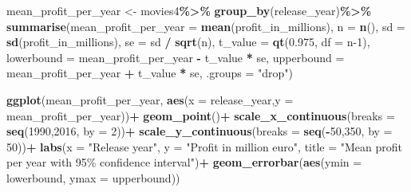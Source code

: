 \documentclass[
]{article}
\newenvironment{Shaded}{\begin{snugshade}}{\end{snugshade}}
\newcommand{\AttributeTok}[1]{\textcolor[rgb]{0.13,0.29,0.53}{#1}}
\newcommand{\DecValTok}[1]{\textcolor[rgb]{0.00,0.00,0.81}{#1}}
\newcommand{\FloatTok}[1]{\textcolor[rgb]{0.00,0.00,0.81}{#1}}
\newcommand{\FunctionTok}[1]{\textcolor[rgb]{0.13,0.29,0.53}{\textbf{#1}}}
\newcommand{\NormalTok}[1]{#1}
\newcommand{\OtherTok}[1]{\textcolor[rgb]{0.56,0.35,0.01}{#1}}
\newcommand{\SpecialCharTok}[1]{\textcolor[rgb]{0.81,0.36,0.00}{\textbf{#1}}}
\newcommand{\StringTok}[1]{\textcolor[rgb]{0.31,0.60,0.02}{#1}}
\begin{document}
\begin{Shaded}
\begin{Highlighting}[]
\NormalTok{mean\_profit\_per\_year }\OtherTok{\textless{}{-}}\NormalTok{ movies4}\SpecialCharTok{\%\textgreater{}\%}
  \FunctionTok{group\_by}\NormalTok{(release\_year)}\SpecialCharTok{\%\textgreater{}\%}
  \FunctionTok{summarise}\NormalTok{(}\AttributeTok{mean\_profit\_per\_year =} \FunctionTok{mean}\NormalTok{(profit\_in\_millions),}
            \AttributeTok{n =} \FunctionTok{n}\NormalTok{(),}
            \AttributeTok{sd =} \FunctionTok{sd}\NormalTok{(profit\_in\_millions),}
            \AttributeTok{se =}\NormalTok{ sd }\SpecialCharTok{/} \FunctionTok{sqrt}\NormalTok{(n),}
            \AttributeTok{t\_value =} \FunctionTok{qt}\NormalTok{(}\FloatTok{0.975}\NormalTok{, }\AttributeTok{df =}\NormalTok{ n}\DecValTok{{-}1}\NormalTok{),}
            \AttributeTok{lowerbound =}\NormalTok{ mean\_profit\_per\_year }\SpecialCharTok{{-}}\NormalTok{ t\_value }\SpecialCharTok{*}\NormalTok{ se,}
            \AttributeTok{upperbound =}\NormalTok{ mean\_profit\_per\_year }\SpecialCharTok{+}\NormalTok{ t\_value }\SpecialCharTok{*}\NormalTok{ se,}
            \AttributeTok{.groups =} \StringTok{"drop"}\NormalTok{)}

\FunctionTok{ggplot}\NormalTok{(mean\_profit\_per\_year, }\FunctionTok{aes}\NormalTok{(}\AttributeTok{x =}\NormalTok{ release\_year,}\AttributeTok{y =}\NormalTok{ mean\_profit\_per\_year))}\SpecialCharTok{+}
  \FunctionTok{geom\_point}\NormalTok{()}\SpecialCharTok{+}
  \FunctionTok{scale\_x\_continuous}\NormalTok{(}\AttributeTok{breaks =} \FunctionTok{seq}\NormalTok{(}\DecValTok{1990}\NormalTok{,}\DecValTok{2016}\NormalTok{, }\AttributeTok{by =} \DecValTok{2}\NormalTok{))}\SpecialCharTok{+}
  \FunctionTok{scale\_y\_continuous}\NormalTok{(}\AttributeTok{breaks =} \FunctionTok{seq}\NormalTok{(}\SpecialCharTok{{-}}\DecValTok{50}\NormalTok{,}\DecValTok{350}\NormalTok{, }\AttributeTok{by =} \DecValTok{50}\NormalTok{))}\SpecialCharTok{+}
  \FunctionTok{labs}\NormalTok{(}\AttributeTok{x =} \StringTok{"Release year"}\NormalTok{,}
       \AttributeTok{y =} \StringTok{"Profit in million euro"}\NormalTok{,}
       \AttributeTok{title =} \StringTok{"Mean profit per year with 95\% confidence interval"}\NormalTok{)}\SpecialCharTok{+}
  \FunctionTok{geom\_errorbar}\NormalTok{(}\FunctionTok{aes}\NormalTok{(}\AttributeTok{ymin =}\NormalTok{ lowerbound,}
                    \AttributeTok{ymax =}\NormalTok{ upperbound))}
\end{Highlighting}
\end{Shaded}
\end{document}

